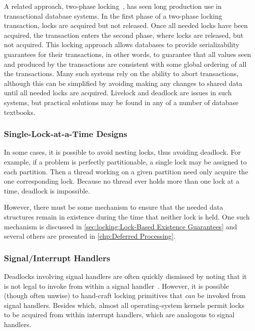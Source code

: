 A related approach, two-phase locking~\cite{PhilipABernstein1987},
has seen long production use in transactional database systems.
In the first phase of a two-phase locking transaction, locks are
acquired but not released.
Once all needed locks have been acquired, the transaction enters the
second phase, where locks are released, but not acquired.
This locking approach allows databases to provide serializability
guarantees for their transactions, in other words, to guarantee
that all values seen and produced by the transactions are consistent
with some global ordering of all the transactions.
Many such systems rely on the ability to abort transactions, although
this can be simplified by avoiding making any changes to shared data
until all needed locks are acquired.
Livelock and deadlock are issues in such systems, but practical
solutions may be found in any of a number of database textbooks.

\subsubsection{Single-Lock-at-a-Time Designs}
\label{sec:locking:Single-Lock-at-a-Time Designs}

In some cases, it is possible to avoid nesting locks, thus avoiding
deadlock.
For example, if a problem is perfectly partitionable, a single
lock may be assigned to each partition.
Then a thread working on a given partition need only acquire the one
corresponding lock.
Because no thread ever holds more than one lock at a time,
deadlock is impossible.

However, there must be some mechanism to ensure that the needed data
structures remain in existence during the time that neither lock is
held.
One such mechanism is discussed in
\cref{sec:locking:Lock-Based Existence Guarantees}
and several others are presented in
\cref{chp:Deferred Processing}.

\subsubsection{Signal/Interrupt Handlers}
\label{sec:locking:Signal/Interrupt Handlers}

Deadlocks involving signal handlers are often quickly dismissed by
noting that it is not legal to invoke  from
within a signal handler~\cite{OpenGroup1997pthreads}.
However, it is possible (though often unwise) to hand-craft
locking primitives that \emph{can} be invoked from signal handlers.
Besides which, almost all operating-system kernels permit locks to
be acquired from within interrupt handlers, which are analogous
to signal handlers.

